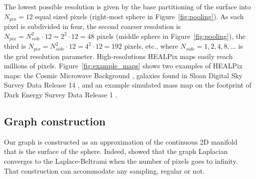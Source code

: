 \documentclass[final,twocolumn,3p,times,authoryear]{elsarticle}
\newcommand{\figref}[1]{Figure~\ref{fig:#1}}
\newcommand{\1}{\b{1}}              %
\newcommand{\0}{\b{0}}              %
\begin{document}
The lowest possible resolution is given by the base partitioning of the surface into $N_{pix} = 12$ equal sized pixels (right-most sphere in \figref{pooling}).
As each pixel is subdivided in four, the second coarser resolution is $N_{pix} = N_{side}^2 \cdot 12 = 2^2 \cdot 12 = 48$ pixels (middle sphere in \figref{pooling}), the third is $N_{pix} = N_{side}^2 \cdot 12 = 4^2 \cdot 12 = 192$ pixels, etc., where $N_{side} = 1, 2, 4, 8, \ldots$ is the grid resolution parameter.
High-resolutions HEALPix maps easily reach millions of pixels.
\figref{example_maps} shows two examples of HEALPix maps: the Cosmic Microwave Background \citep{planck2015overview}, galaxies found in Sloan Digital Sky Survey Data Release 14 \citep{abolfathi2017sdssDR14}, and an example simulated mass map on the footprint of Dark Energy Survey Data Release 1 \citep{des2018dr1}.

\subsection{Graph construction}

Our graph is constructed as an approximation of the continuous 2D manifold that is the surface of the sphere.
Indeed, \citet{belkin2007convergence} showed that the graph Laplacian converges to the Laplace-Beltrami when the number of pixels goes to infinity.
That construction can accommodate any sampling, regular or not.
\end{document}
